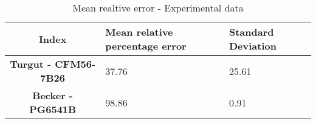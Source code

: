 \begin{table}[h!]
  \centering
  \begin{tabularx}{\textwidth}{||c|X|X||}
  \hline
    \cellcolor{gray!20}\textbf{Index} & \cellcolor{gray!20}\textbf{Mean relative percentage error} & \cellcolor{gray!20}\textbf{Standard Deviation} \\ [0.5ex]
  \hline\hline
\centering
    \cellcolor{gray!20}\textbf{Turgut - CFM56-7B26} & 37.76 & 25.61 \\
  \hline
    \cellcolor{gray!20}\textbf{Becker - PG6541B} & 98.86 & 0.91 \\
  \hline
  \end{tabularx}
  \caption{Mean realtive error - Experimental data}
  \label{meanEE}
\end{table}
